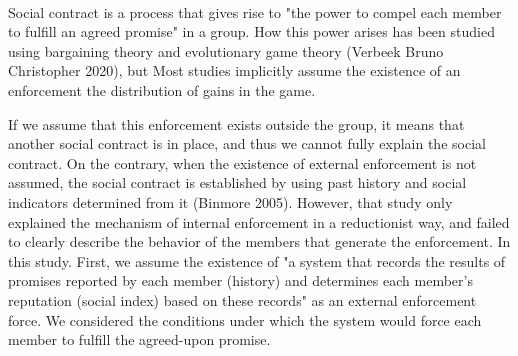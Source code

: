 ~ \\
  Social contract is a process that gives rise to "the power to compel each member to fulfill an agreed promise" in a group.
  How this power arises has been studied using bargaining theory and evolutionary game theory (Verbeek Bruno Christopher 2020)\cite{sep-game-ethics}, 
  but Most studies implicitly assume the existence of an enforcement the distribution of gains in the game.

  If we assume that this enforcement exists outside the group, 
  it means that another social contract is in place, and thus we cannot fully explain the social contract.
  On the contrary, when the existence of external enforcement is not assumed, 
  the social contract is established by using past history and social indicators determined from it (Binmore 2005).
  However, that study only explained the mechanism of internal enforcement in a reductionist way, 
  and failed to clearly describe the behavior of the members that generate the enforcement.
  In this study. 
  First, we assume the existence of "a system that records the results of promises reported by each member (history) 
  and determines each member's reputation (social index) based on these records" as an external enforcement force. 
  We considered the conditions under which the system would force each member to fulfill the agreed-upon promise.
